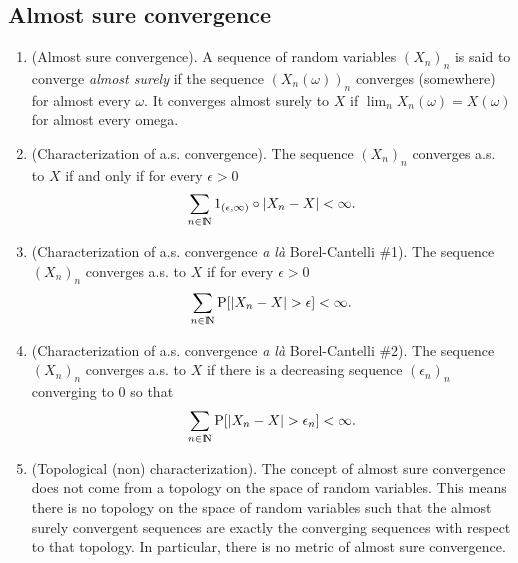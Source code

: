 \documentclass[a4paper,10pt]{article}
\begin{document}
\subsection{Almost sure convergence}
\begin{enumerate}
 \item (Almost sure convergence). A sequence of random variables $(X_n)_n$ is said to converge \textit{almost surely}
       if the sequence $(X_n(\omega))_n$ converges (somewhere) for almost every $\omega$. It converges almost surely to $X$
       if $\lim_n X_n(\omega) = X(\omega)$ for almost every omega.
       
 \item (Characterization of a.s. convergence). The sequence $(X_n)_n$ converges a.s. to $X$ if and only if for every $\epsilon>0$
       \[
        \sum_{n\in\N}1_{(\epsilon,\infty)}\circ|X_n - X| < \infty.
       \]

 \item (Characterization of a.s. convergence \textit{a l\`a} Borel-Cantelli \#1).
       The sequence $(X_n)_n$ converges a.s. to $X$ if for every $\epsilon>0$
       \[
        \sum_{n\in\N}\prob[|X_n-X|>\epsilon] < \infty.
       \]

 \item (Characterization of a.s. convergence \textit{a l\`a} Borel-Cantelli \#2).
       The sequence $(X_n)_n$ converges a.s. to $X$ if there is a decreasing sequence $(\epsilon_n)_n$
       converging to $0$ so that 
       \[
        \sum_{n\in\N}\prob[|X_n-X|>\epsilon_n] < \infty.
       \]
       
 \item (Topological (non) characterization).
       The concept of almost sure convergence does not come from a topology on the space 
       of random variables. This means there is no topology on the space of random variables 
       such that the almost surely convergent sequences are exactly the converging sequences 
       with respect to that topology. In particular, there is no metric of almost sure convergence.
\end{enumerate}
\end{document}
